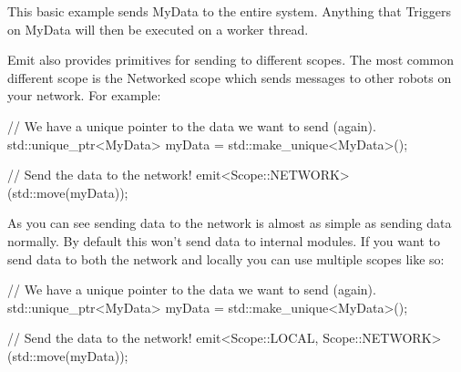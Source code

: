 \documentclass[english,12pt]{scrartcl}
\begin{document}
				This basic example sends MyData to the entire system.
				Anything that Triggers on MyData will then be executed on a worker thread.

				Emit also provides primitives for sending to different scopes.
				The most common different scope is the Networked scope which sends messages to other robots on your network.
				For example:

				\begin{cppcode}
					// We have a unique pointer to the data we want to send (again).
					std::unique_ptr<MyData> myData = std::make_unique<MyData>();

					// Send the data to the network!
					emit<Scope::NETWORK>(std::move(myData));
				\end{cppcode}

				As you can see sending data to the network is almost as simple as sending data normally.
				By default this won't send data to internal modules.
				If you want to send data to both the network and locally you can use multiple scopes like so:

				\begin{cppcode}
					// We have a unique pointer to the data we want to send (again).
					std::unique_ptr<MyData> myData = std::make_unique<MyData>();

					// Send the data to the network!
					emit<Scope::LOCAL, Scope::NETWORK>(std::move(myData));
				\end{cppcode}
\end{document}
